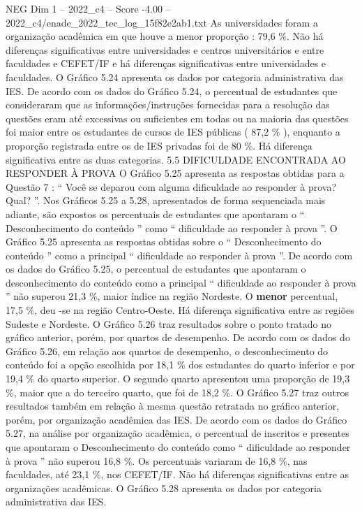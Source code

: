 \begin{textsample}{NEG Dim 1 – 2022\_c4 – Score -4.00 – 2022\_c4/enade\_2022\_tec\_log\_15f82e2ab1.txt}
As universidades foram a organização acadêmica em que houve a menor proporção : 79,6 \%.
Não há diferenças significativas entre universidades e centros universitários e entre faculdades e CEFET/IF e há diferenças significativas entre universidades e faculdades.
O Gráfico 5.24 apresenta os dados por categoria administrativa das IES.
De acordo com os dados do Gráfico 5.24, o percentual de estudantes que consideraram que as informações/instruções fornecidas para a resolução das questões eram até excessivas ou suficientes em todas ou na maioria das questões foi maior entre os estudantes de cursos de IES públicas ( 87,2 \% ), enquanto a proporção registrada entre os de IES privadas foi de 80 \%.
Há diferença significativa entre as duas categorias. 5.5 DIFICULDADE ENCONTRADA AO RESPONDER À PROVA O Gráfico 5.25 apresenta as respostas obtidas para a Questão 7 : “ Você se deparou com alguma dificuldade ao responder à prova?
Qual? ”.
Nos Gráficos 5.25 a 5.28, apresentados de forma sequenciada mais adiante, são expostos os percentuais de estudantes que apontaram o “ Desconhecimento do conteúdo ” como “ dificuldade ao responder à prova ”.
O Gráfico 5.25 apresenta as respostas obtidas sobre o “ Desconhecimento do conteúdo ” como a principal “ dificuldade ao responder à prova ”.
De acordo com os dados do Gráfico 5.25, o percentual de estudantes que apontaram o desconhecimento do conteúdo como a principal “ dificuldade ao responder à prova ” não superou 21,3 \%, maior índice na região Nordeste.
O \textbf{menor} percentual, 17,5 \%, deu -se na região Centro-Oeste.
Há diferença significativa entre as regiões Sudeste e Nordeste.
O Gráfico 5.26 traz resultados sobre o ponto tratado no gráfico anterior, porém, por quartos de desempenho.
De acordo com os dados do Gráfico 5.26, em relação aos quartos de desempenho, o desconhecimento do conteúdo foi a opção escolhida por 18,1 \% dos estudantes do quarto inferior e por 19,4 \% do quarto superior.
O segundo quarto apresentou uma proporção de 19,3 \%, maior que a do terceiro quarto, que foi de 18,2 \%.
O Gráfico 5.27 traz outros resultados também em relação à mesma questão retratada no gráfico anterior, porém, por organização acadêmica das IES.
De acordo com os dados do Gráfico 5.27, na análise por organização acadêmica, o percentual de inscritos e presentes que apontaram o Desconhecimento do conteúdo como “ dificuldade ao responder à prova ” não superou 16,8 \%.
Os percentuais variaram de 16,8 \%, nas faculdades, até 23,1 \%, nos CEFET/IF.
Não há diferenças significativas entre as organizações acadêmicas.
O Gráfico 5.28 apresenta os dados por categoria administrativa das IES.

\end{textsample}
